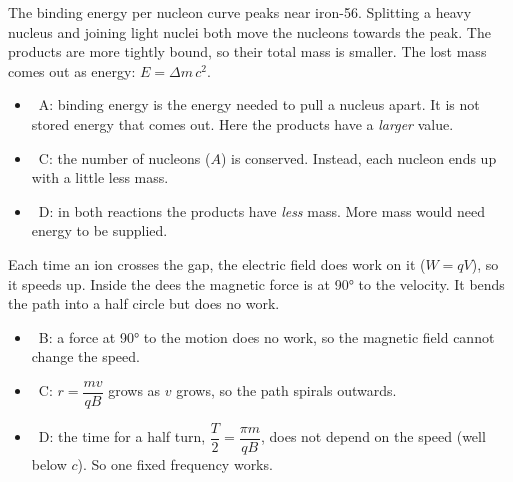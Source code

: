 \begin{practiceanswers}
\begin{practiceans}
  The binding energy per nucleon curve peaks near iron-56. Splitting a heavy nucleus and
  joining light nuclei both move the nucleons towards the peak. The products are more
  tightly bound, so their total mass is smaller. The lost mass comes out as energy:
  $E = \Delta m\,c^2$.
  \begin{itemize}
    \item \xmark\ A: binding energy is the energy needed to pull a nucleus apart. It is not
          stored energy that comes out. Here the products have a \emph{larger} value.
    \item \xmark\ C: the number of nucleons ($A$) is conserved. Instead, each nucleon ends up
          with a little less mass.
    \item \xmark\ D: in both reactions the products have \emph{less} mass. More mass would
          need energy to be supplied.
  \end{itemize}
\end{practiceans}

\begin{practiceans}
  Each time an ion crosses the gap, the electric field does work on it ($W = qV$), so it
  speeds up. Inside the dees the magnetic force is at \ang{90} to the velocity. It bends the
  path into a half circle but does no work.
  \begin{itemize}
    \item \xmark\ B: a force at \ang{90} to the motion does no work, so the magnetic field
          cannot change the speed.
    \item \xmark\ C: $r = \dfrac{mv}{qB}$ grows as $v$ grows, so the path spirals outwards.
    \item \xmark\ D: the time for a half turn, $\dfrac{T}{2} = \dfrac{\pi m}{qB}$, does not
          depend on the speed (well below $c$). So one fixed frequency works.
  \end{itemize}
\end{practiceans}


\end{practiceanswers}
